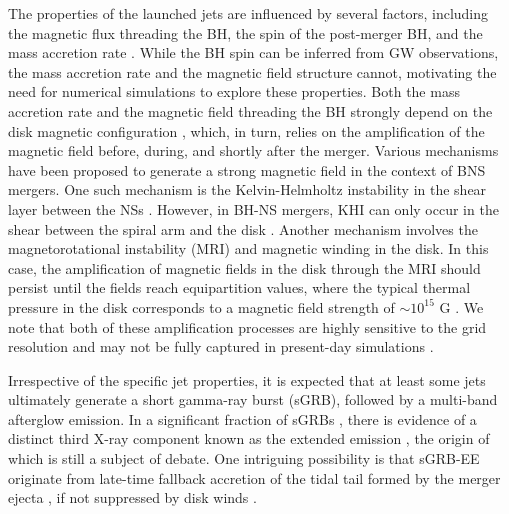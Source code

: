 \documentclass[twocolumn,dvipsnames]{aastex62}
\begin{document}
The properties of the launched jets are influenced by several factors, including the magnetic flux threading the BH, the spin of the post-merger BH, and the mass accretion rate \citep{Blandford1977,Tchekhovskoy2011,2015ASSL..414...45T}. While the BH spin can be inferred from GW observations, the mass accretion rate and the magnetic field structure cannot, motivating the need for numerical simulations to explore these properties. Both the mass accretion rate and the magnetic field threading the BH strongly depend on the disk magnetic configuration \citep{Rosswog2007}, which, in turn, relies on the amplification of the magnetic field before, during, and shortly after the merger. Various mechanisms have been proposed to generate a strong magnetic field in the context of BNS mergers. One such mechanism is the Kelvin-Helmholtz instability \citep[KHI;][]{Helmholtz1868,Thomson1871} in the shear layer between the NSs \citep{Price2006}. However, in BH-NS mergers, KHI can only occur in the shear between the spiral arm and the disk \citep{Hayashi2022a}. Another mechanism involves the magnetorotational instability (MRI) and magnetic winding in the disk. In this case, the amplification of magnetic fields in the disk through the MRI should persist until the fields reach equipartition values, where the typical thermal pressure in the disk corresponds to a magnetic field strength of $\sim 10^{15}$ G \citep{Kiuchi2015}. We note that both of these amplification processes are highly sensitive to the grid resolution and may not be fully captured in present-day simulations \citep{Kiuchi2018}.

Irrespective of the specific jet properties, it is expected that at least some jets ultimately generate a short gamma-ray burst (sGRB), followed by a multi-band afterglow emission. In a significant fraction of sGRBs \citep[$ \sim 25\% - 50\% $;][]{Norris2008,Norris2010}, there is evidence of a distinct third X-ray component known as the extended emission \citep[EE;][]{Norris2006,Perley2009}, the origin of which is still a subject of debate. One intriguing possibility is that sGRB-EE originate from late-time fallback accretion of the tidal tail formed by the merger ejecta \citep{Rosswog2007}, if not suppressed by disk winds \citep{Fernandez2015,Fernandez2017}.
\end{document}
